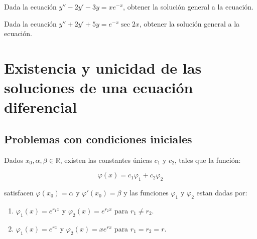 		\begin{ejercicio}
			Dada la ecuación $y'' - 2 y' - 3 y = x e^{-x}$, obtener la solución general a la ecuación.
		\end{ejercicio}

		\begin{ejercicio}
			Dada la ecuación $y'' + 2 y' + 5 y = e^{-x} \sec{2x}$, obtener la solución general a la ecuación.
		\end{ejercicio}

\newpage
\section{Existencia y unicidad de las soluciones de una ecuación diferencial}

	\subsection{Problemas con condiciones iniciales}

		\begin{teorema}
			Dados $x_0, \alpha, \beta \in \mathbb{R}$, existen las constantes únicas $c_1$ y $c_2$, tales que la función:

			\begin{equation}
				\varphi(x) = c_1 \varphi_1 + c_2 \varphi_2
			\end{equation}

			satisfacen $\varphi(x_0) = \alpha$ y $\varphi'(x_0) = \beta$ y las funciones $\varphi_1$ y $\varphi_2$ estan dadas por:

			\begin{enumerate}
				\item $\varphi_1(x) = e^{r_1 x}$ y $\varphi_2(x) = e^{r_2 x}$ para $r_1 \ne r_2$.
				\item $\varphi_1(x) = e^{rx}$ y $\varphi_2(x) = x e^{rx}$ para $r_1 = r_2 = r$.
			\end{enumerate}
		\end{teorema}

